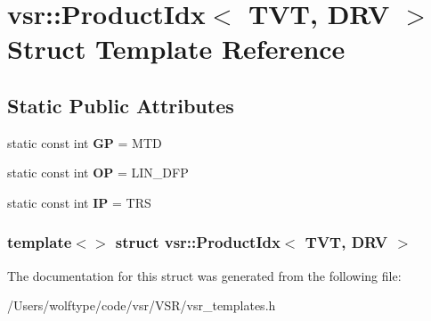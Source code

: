 \hypertarget{structvsr_1_1_product_idx_3_01_t_v_t_00_01_d_r_v_01_4}{\section{vsr\-:\-:Product\-Idx$<$ T\-V\-T, D\-R\-V $>$ Struct Template Reference}
\label{structvsr_1_1_product_idx_3_01_t_v_t_00_01_d_r_v_01_4}
}
\subsection*{Static Public Attributes}
\begin{DoxyCompactItemize}
\item 
\hypertarget{structvsr_1_1_product_idx_3_01_t_v_t_00_01_d_r_v_01_4_a6c1cf1e278b3fb2fd0328e01e7ae493a}{static const int {\bfseries G\-P} = M\-T\-D}\label{structvsr_1_1_product_idx_3_01_t_v_t_00_01_d_r_v_01_4_a6c1cf1e278b3fb2fd0328e01e7ae493a}

\item 
\hypertarget{structvsr_1_1_product_idx_3_01_t_v_t_00_01_d_r_v_01_4_a3fc0a13fa4d716d3d93febc24efa56eb}{static const int {\bfseries O\-P} = L\-I\-N\-\_\-\-D\-F\-P}\label{structvsr_1_1_product_idx_3_01_t_v_t_00_01_d_r_v_01_4_a3fc0a13fa4d716d3d93febc24efa56eb}

\item 
\hypertarget{structvsr_1_1_product_idx_3_01_t_v_t_00_01_d_r_v_01_4_a92d39ce8dcb4c6f1471e71150aa4c4ba}{static const int {\bfseries I\-P} = T\-R\-S}\label{structvsr_1_1_product_idx_3_01_t_v_t_00_01_d_r_v_01_4_a92d39ce8dcb4c6f1471e71150aa4c4ba}

\end{DoxyCompactItemize}
\subsubsection*{template$<$$>$ struct vsr\-::\-Product\-Idx$<$ T\-V\-T, D\-R\-V $>$}



The documentation for this struct was generated from the following file\-:\begin{DoxyCompactItemize}
\item 
/\-Users/wolftype/code/vsr/\-V\-S\-R/vsr\-\_\-templates.\-h\end{DoxyCompactItemize}
